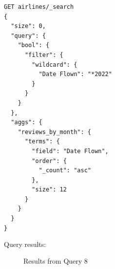 \documentclass{Configuration_Files/PoliMi3i_thesis}
\begin{document}
\begin{enumerate}
    \begin{verbatim}
GET airlines/_search
{
  "size": 0,
  "query": {
    "bool": {
      "filter": {
        "wildcard": {
          "Date Flown": "*2022"
        }
      }
    }
  },
  "aggs": {
    "reviews_by_month": {
      "terms": {
        "field": "Date Flown",
        "order": {
          "_count": "asc"
        },
        "size": 12
      }
    }
  }
}
    \end{verbatim}

Query results:
\begin{figure}[H]
    \centering
    \quad
        \caption{Results from Query 8}


\end{figure}
\end{enumerate}
\end{document}
